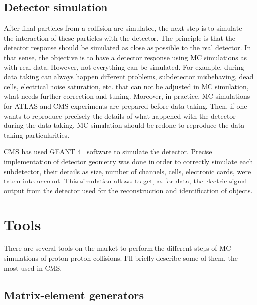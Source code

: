 \subsection{Detector simulation}
\label{sec:detector}

After final particles from a collision are simulated, the next step is to simulate the interaction of these particles with the detector. The principle is that the detector response should be simulated as close as possible to the real detector. In that sense, the objective is to have a detector response using MC simulations as with real data. However, not everything can be simulated. For example, during data taking can always happen different problems, subdetector misbehaving, dead cells, electrical noise saturation, etc. that can not be adjusted in MC simulation, what needs further correction and tuning. Moreover, in practice, MC simulations for ATLAS and CMS experiments are prepared before data taking. Then, if one wants to reproduce precisely the details of what happened with the detector during the data taking, MC simulation should be redone to reproduce the data taking particularities. 

CMS has used GEANT 4~\cite{Agostinelli:2002hh} software to simulate the detector. Precise implementation of detector geometry was done in order to correctly simulate each subdetector, their details as size, number of channels, cells, electronic cards, were taken into account. This simulation allows to get, as for data, the electric signal output from the detector used for the reconstruction and identification of objects. 


\section{Tools}
\label{sec:tools}

There are several tools on the market to perform the different steps of MC simulations of proton-proton collisions. I'll briefly describe some of them, the most used in CMS.

\subsection{Matrix-element generators}
\label{sec:ME}

